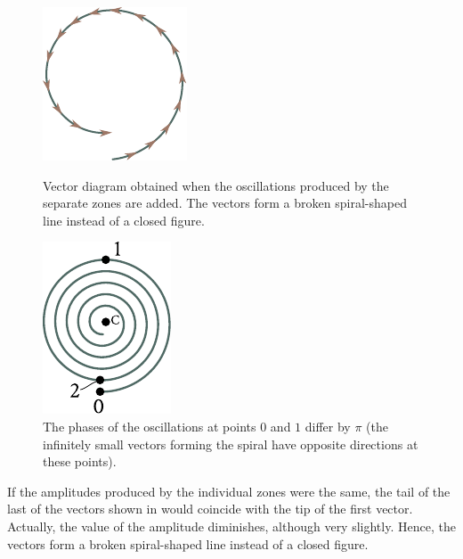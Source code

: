 \begin{figure}[t]
	\begin{minipage}[t]{0.48\linewidth}
		\begin{center}
			\includegraphics[scale=1]{figures/ch_18/fig_18_6.pdf}
            \caption[]{Vector diagram obtained when the oscillations produced by the separate zones are added. The vectors form a broken spiral-shaped line instead of a closed figure.}
			\label{fig:18_6}
		\end{center}
	\end{minipage}
	\hfill{ }%
	\begin{minipage}[t]{0.48\linewidth}
		\begin{center}
			\includegraphics[scale=1]{figures/ch_18/fig_18_7.pdf}
			\caption[]{The phases of the oscillations at points $0$ and $1$ differ by $\pi$ (the infinitely small vectors forming the spiral have opposite directions at these points).}
			\label{fig:18_7}
		\end{center}
	\end{minipage}
\vspace{-0.4cm}
\end{figure}

If the amplitudes produced by the individual zones were the same, the tail of the last of the vectors shown in  would coincide with the tip of the first vector.
Actually, the value of the amplitude diminishes, although very slightly.
Hence, the vectors form a broken spiral-shaped line instead of a closed figure.

